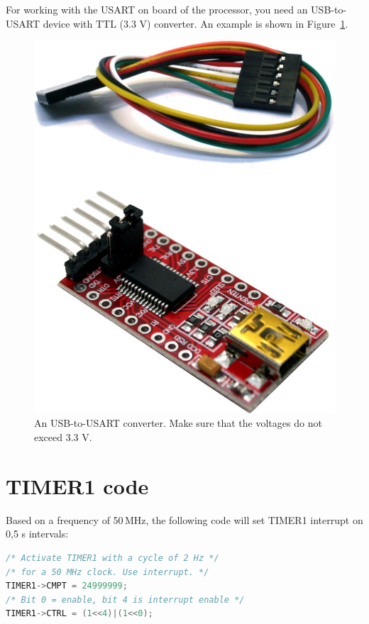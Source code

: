 \documentclass[12pt]{article}
\begin{document}
For working with the USART on board of the processor, you need an USB-to-USART device with TTL (3.3 V) converter. An example is shown in Figure~\ref{fig:usb-usart-ttl}.

\begin{figure}[!ht]
\centering
\includegraphics[scale=0.1]{usb-usart-ttl}
\caption{An USB-to-USART converter. Make sure that the voltages do not exceed 3.3 V.}
\label{fig:usb-usart-ttl}
\end{figure}


\section{TIMER1 code}
Based on a frequency of 50$\,$MHz, the following code will set TIMER1 interrupt on 0,5 s intervals:

\begin{lstlisting}[language=C]
/* Activate TIMER1 with a cycle of 2 Hz */
/* for a 50 MHz clock. Use interrupt. */
TIMER1->CMPT = 24999999;
/* Bit 0 = enable, bit 4 is interrupt enable */
TIMER1->CTRL = (1<<4)|(1<<0);
\end{lstlisting}
\end{document}
